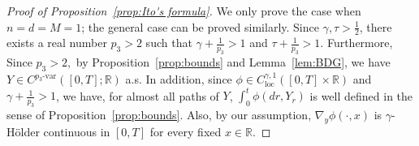 \documentclass[10pt,a4paper]{amsart}
\begin{document}
\begin{proof}[Proof of Proposition~\ref{prop:Ito's formula}]
\makeatletter{}\makeatother
\label{proof:Ito}
We only prove the case when $n=d=M=1$; the general case can be proved similarly. Since $\gamma,\tau>\frac{1}{2}$, there exists a real number $p_{3} > 2$  such that $\gamma + \frac{1}{p_{3}} > 1$ and $\tau + \frac{1}{p_{3}}>1$. Furthermore, Since $p_3>2,$ by Proposition~\ref{prop:bounds} and Lemma~\ref{lem:BDG}, we have $Y\in C^{p_{3}\text{-var}}([0,T];\mathbb{R})$ a.s. In addition, since $\phi\in C^{\gamma,1}_{\text{loc}}([0,T]\times\mathbb{R})$ and $\gamma + \frac{1}{p_{3}}>1$, we have, for almost all paths of $Y$,  $\int_{0}^{t}\phi(dr,Y_{r})$ is well defined in the sense of Proposition~\ref{prop:bounds}. Also, by our assumption, $\nabla_{y}\phi(\cdot,x)$ is $\gamma$-H\"older continuous in $[0,T]$ for every fixed $ x\in \mathbb{R}$. 


\end{proof}
\end{document}
